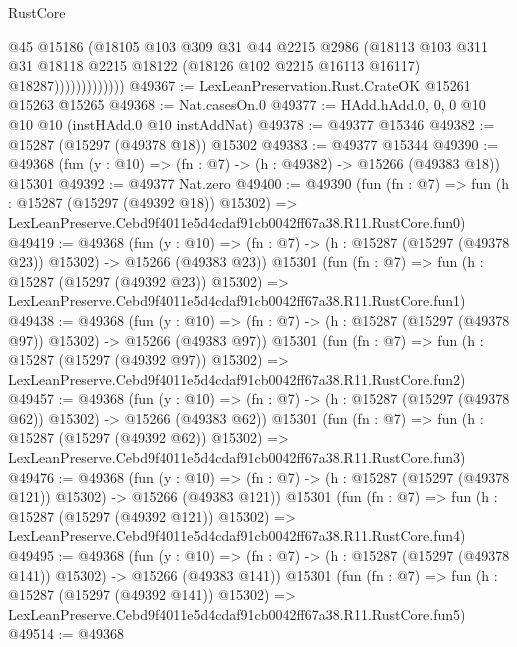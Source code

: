 \begin{lexlean}{RustCore}
\begin{coremodule}
                          @45
                          @15186
                          (@18105
                            @103
                            @309
                            @31
                            @44
                            @2215
                            @2986
                            (@18113
                              @103
                              @311
                              @31
                              @18118
                              @2215
                              @18122
                              (@18126 @102 @2215 @16113 @16117)
                              @18287)))))))))))))
@49367 := LexLeanPreservation.Rust.CrateOK @15261 @15263 @15265
@49368 := Nat.casesOn.{0}
@49377 := HAdd.hAdd.{0, 0, 0} @10 @10 @10 (instHAdd.{0} @10 instAddNat)
@49378 := @49377 @15346
@49382 := @15287 (@15297 (@49378 @18)) @15302
@49383 := @49377 @15344
@49390 := @49368 (fun (y : @10) => (fn : @7) -> (h : @49382) -> @15266 (@49383 @18)) @15301
@49392 := @49377 Nat.zero
@49400 := @49390
    (fun (fn : @7) =>
    fun (h : @15287 (@15297 (@49392 @18)) @15302) =>
    LexLeanPreserve.Cebd9f4011e5d4cdaf91cb0042ff67a38.R11.RustCore.fun0)
@49419 := @49368
    (fun (y : @10) => (fn : @7) -> (h : @15287 (@15297 (@49378 @23)) @15302) -> @15266 (@49383 @23))
    @15301
    (fun (fn : @7) =>
    fun (h : @15287 (@15297 (@49392 @23)) @15302) =>
    LexLeanPreserve.Cebd9f4011e5d4cdaf91cb0042ff67a38.R11.RustCore.fun1)
@49438 := @49368
    (fun (y : @10) => (fn : @7) -> (h : @15287 (@15297 (@49378 @97)) @15302) -> @15266 (@49383 @97))
    @15301
    (fun (fn : @7) =>
    fun (h : @15287 (@15297 (@49392 @97)) @15302) =>
    LexLeanPreserve.Cebd9f4011e5d4cdaf91cb0042ff67a38.R11.RustCore.fun2)
@49457 := @49368
    (fun (y : @10) => (fn : @7) -> (h : @15287 (@15297 (@49378 @62)) @15302) -> @15266 (@49383 @62))
    @15301
    (fun (fn : @7) =>
    fun (h : @15287 (@15297 (@49392 @62)) @15302) =>
    LexLeanPreserve.Cebd9f4011e5d4cdaf91cb0042ff67a38.R11.RustCore.fun3)
@49476 := @49368
    (fun (y : @10) =>
    (fn : @7) -> (h : @15287 (@15297 (@49378 @121)) @15302) -> @15266 (@49383 @121))
    @15301
    (fun (fn : @7) =>
    fun (h : @15287 (@15297 (@49392 @121)) @15302) =>
    LexLeanPreserve.Cebd9f4011e5d4cdaf91cb0042ff67a38.R11.RustCore.fun4)
@49495 := @49368
    (fun (y : @10) =>
    (fn : @7) -> (h : @15287 (@15297 (@49378 @141)) @15302) -> @15266 (@49383 @141))
    @15301
    (fun (fn : @7) =>
    fun (h : @15287 (@15297 (@49392 @141)) @15302) =>
    LexLeanPreserve.Cebd9f4011e5d4cdaf91cb0042ff67a38.R11.RustCore.fun5)
@49514 := @49368

\end{coremodule}
\end{lexlean}
